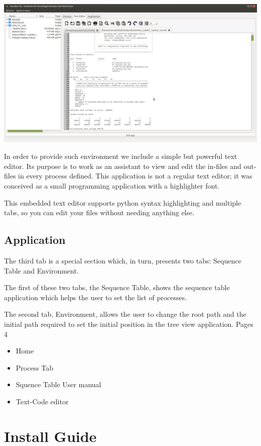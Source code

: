 \documentclass[a4paper,10pt]{article}
\begin{document}
\begin{center}
 \includegraphics[width=\textwidth]{img/textEditor.png}
\end{center}

In order to provide such environment we include a simple but powerful text editor. Its purpose is to work as an assistant to view and edit the in-files and out-files in every process defined. This application is not a regular text editor; it was conceived as a small programming application with a highlighter font.

This embedded text editor supports python syntax highlighting and multiple tabs, so you can edit your files without needing anything else.

\subsection{Application}

The third tab is a special section which, in turn, presents two tabs: Sequence Table and Environment.

The first of these two tabs, the Sequence Table, shows the sequence table application which helps the user to set the list of processes.

The second tab, Environment, allows the user to change the root path and the initial path required to set the initial position in the tree view application. Pages 4
\begin{itemize}
 \item Home
 \item Process Tab
 \item Squence Table User manual
 \item Text-Code editor
\end{itemize}

\section{Install Guide}
\end{document}
